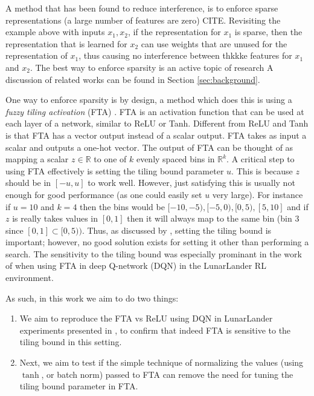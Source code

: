 \documentclass{article}
\newcommand{\RR}{\mathbb{R}}
\begin{document}
A method that has been found to reduce interference, is to enforce sparse representations (a large number of features are zero) CITE.
Revisiting the example above with inputs $x_1, x_2$, if the representation for $x_1$ is sparse, then the representation that is learned for $x_2$ can use weights that are unused for the representation of $x_1$, 
thus causing no interference between thkkke features for $x_1$ and $x_2$.
The best way to enforce sparsity is an active topic of research 
A discussion of related works can be found in Section \ref{sec:background}.

One way to enforce sparsity is by design, a method which does this is using a \textit{fuzzy tiling activation} (FTA) \cite[]{pan2019fuzzy}.
FTA is an activation function that can be used at each layer of a network, similar to ReLU or Tanh.
Different from ReLU and Tanh is that FTA has a vector output instead of a scalar output.
FTA takes as input a scalar and outputs a one-hot vector.
The output of FTA can be thought of as mapping a scalar $z \in \RR$ to one of $k$ evenly spaced bins in $\RR^k$.
A critical step to using FTA effectively is setting the tiling bound parameter $u$.
This is because $z$ should be in $[-u, u]$ to work well. 
However, just satisfying this is usually not enough for good performance (as one could easily set $u$ very large).
For instance if $u = 10$ and $k = 4$ then the bins would be $[-10, -5), [-5, 0), [0, 5), [5, 10]$ 
and if $z$ is really takes values in $[0,1]$ then it will always map to the same bin (bin $3$ since $[0, 1] \subset [0, 5))$.
Thus, as discussed by \cite[]{pan2019fuzzy}, setting the tiling bound is important; however, no good solution exists for setting it other than performing a search.
The sensitivity to the tiling bound was especially prominant in the work of \cite[]{pan2019fuzzy} when using FTA in deep Q-network (DQN) \cite[]{mnih2013playing} in the LunarLander RL environment.

As such, in this work we aim to do two things:
\begin{enumerate}
  \item We aim to reproduce the FTA vs ReLU using DQN in LunarLander experiments presented in \cite[]{pan2019fuzzy}, to confirm that indeed FTA is sensitive to the tiling bound in this setting.
  \item Next, we aim to test if the simple technique of normalizing the values (using $\tanh$, or batch norm) passed to FTA can remove the need for tuning the tiling bound parameter in FTA.
\end{enumerate}
\end{document}

